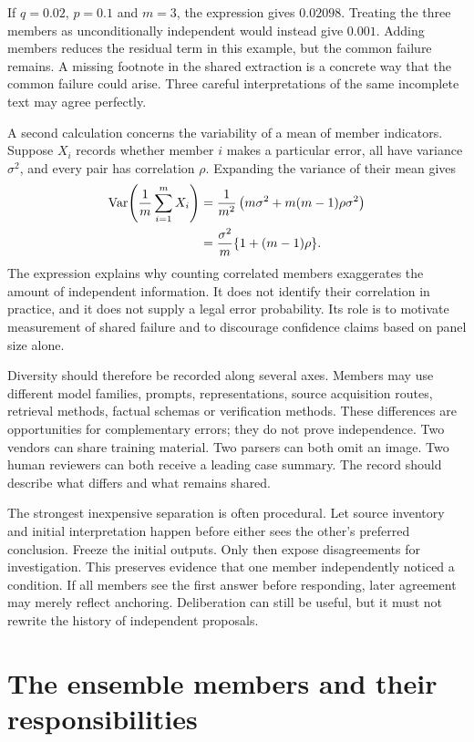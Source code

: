 \documentclass[12pt,a4paper,oneside,openany]{book}
\begin{document}
If $q=0.02$, $p=0.1$ and $m=3$, the expression gives $0.02098$. Treating the three
members as unconditionally independent would instead give $0.001$. Adding
members reduces the residual term in this example, but the common failure
remains. A missing footnote in the shared extraction is a concrete way that the
common failure could arise. Three careful interpretations of the same incomplete
text may agree perfectly.

A second calculation concerns the variability of a mean of member indicators.
Suppose $X_i$ records whether member $i$ makes a particular error, all have variance
$\sigma^2$, and every pair has correlation $\rho$. Expanding the variance of their
mean gives
\begin{align}
 \operatorname{Var}\!\left(\frac1m\sum_{i=1}^m X_i\right)
 &=\frac{1}{m^2}\left(m\sigma^2+m(m-1)\rho\sigma^2\right)\notag\\
 &=\frac{\sigma^2}{m}\{1+(m-1)\rho\}.
 \label{eq:ensemble-variance}
\end{align}
The expression explains why counting correlated members exaggerates the amount
of independent information. It does not identify their correlation in practice,
and it does not supply a legal error probability. Its role is to motivate
measurement of shared failure and to discourage confidence claims based on panel
size alone.

Diversity should therefore be recorded along several axes. Members may use
different model families, prompts, representations, source acquisition routes,
retrieval methods, factual schemas or verification methods. These differences are
opportunities for complementary errors; they do not prove independence. Two
vendors can share training material. Two parsers can both omit an image. Two human
reviewers can both receive a leading case summary. The record should describe
what differs and what remains shared.

The strongest inexpensive separation is often procedural. Let source inventory
and initial interpretation happen before either sees the other's preferred
conclusion. Freeze the initial outputs. Only then expose disagreements for
investigation. This preserves evidence that one member independently noticed a
condition. If all members see the first answer before responding, later agreement
may merely reflect anchoring. Deliberation can still be useful, but it must not
rewrite the history of independent proposals.

\section{The ensemble members and their responsibilities}
\end{document}
